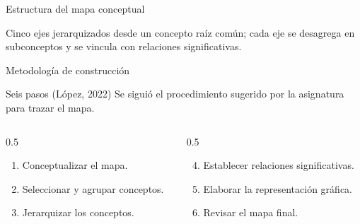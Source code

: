 \documentclass[
  spanish,
  aspectratio=169,
  xcolor={dvipsnames,table}
]{beamer}
\begin{document}
\begin{frame}{Estructura del mapa conceptual}
  \begin{center}
  \end{center}
  {\footnotesize Cinco ejes jerarquizados desde un concepto raíz común; cada eje se desagrega en subconceptos y se vincula con relaciones significativas.}
\end{frame}

\begin{frame}{Metodología de construcción}
  \begin{block}{Seis pasos (López, 2022)}
    Se siguió el procedimiento sugerido por la asignatura para trazar el mapa.
  \end{block}
  \begin{columns}[T]
    \begin{column}{0.5\linewidth}
      \begin{enumerate}
        \item Conceptualizar el mapa.
        \item Seleccionar y agrupar conceptos.
        \item Jerarquizar los conceptos.
      \end{enumerate}
    \end{column}
    \begin{column}{0.5\linewidth}
      \begin{enumerate}\setcounter{enumi}{3}
        \item Establecer relaciones significativas.
        \item Elaborar la representación gráfica.
        \item Revisar el mapa final.
      \end{enumerate}
    \end{column}
  \end{columns}
\end{frame}
\end{document}
